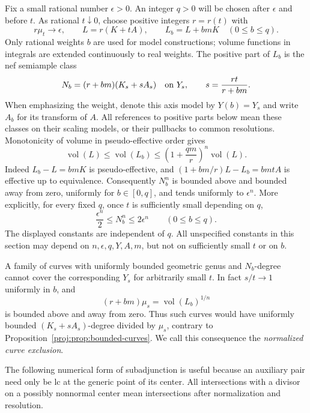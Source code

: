 \documentclass[11pt,letterpaper]{article}
\theoremstyle{definition}
\theoremstyle{remark}
\begin{document}
Fix a small rational number \(\epsilon>0\).  An integer \(q>0\) will
be chosen after \(\epsilon\) and before \(t\).  As rational \(t\downarrow0\),
choose positive integers \(r=r(t)\) with
\begin{equation}\label{proj:jet:normalization}
 r\mu_t\longrightarrow\epsilon,\qquad
 L=r(K+tA),\qquad L_b=L+bmK\quad(0\le b\le q).
\end{equation}
Only rational weights \(b\) are used for model constructions;
volume functions in integrals are extended continuously to real weights.
The positive part of \(L_b\) is
the nef semiample class
\[
 N_b=(r+bm)(K_s+sA_s)
 \quad\hbox{on }Y_s,\qquad s=\frac{rt}{r+bm}.
\]
When emphasizing the weight, denote this axis model by \(Y(b)=Y_s\)
and write \(A_b\) for its transform of \(A\).
All references to positive parts below mean these classes on their
scaling models, or their pullbacks to common resolutions.  Monotonicity
of volume in pseudo-effective order gives
\begin{equation}\label{proj:jet:volume-comparison}
 \operatorname{vol}(L)\le \operatorname{vol}(L_b)\le
 \left(1+\frac{qm}{r}\right)^n\operatorname{vol}(L).
\end{equation}
Indeed \(L_b-L=bmK\) is pseudo-effective, and
\((1+bm/r)L-L_b=bmtA\) is effective up to equivalence.
Consequently \(N_b^n\) is bounded above and bounded away from zero,
uniformly for \(b\in[0,q]\), and tends uniformly to \(\epsilon^n\).
More explicitly, for every fixed \(q\), once \(t\) is sufficiently
small depending on \(q\),
\begin{equation}\label{proj:jet:uniform-normalized-volume}
 \frac{\epsilon^n}{2}\le N_b^n\le2\epsilon^n
 \qquad(0\le b\le q).
\end{equation}
The displayed constants are independent of \(q\).
All unspecified constants in this section may depend on
\(n,\epsilon,q,Y,A,m\), but not on sufficiently small \(t\) or on \(b\).

A family of curves with uniformly bounded geometric genus and
\(N_b\)-degree cannot cover the corresponding \(Y_s\) for arbitrarily
small \(t\).  In fact \(s/t\to1\) uniformly in \(b\), and
\[
 (r+bm)\mu_s=\operatorname{vol}(L_b)^{1/n}
\]
is bounded above and away from zero.  Thus such curves would have
uniformly bounded \((K_s+sA_s)\)-degree divided by \(\mu_s\), contrary
to Proposition~\ref{proj:prop:bounded-curves}.  We call this consequence the
\emph{normalized curve exclusion}.

The following numerical form of subadjunction is useful because an
auxiliary pair need only be lc at the generic point of its center.
All intersections with a divisor on a possibly nonnormal center mean
intersections after normalization and resolution.
\end{document}
